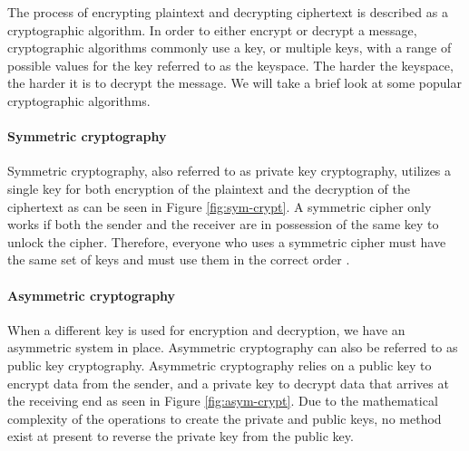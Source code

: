 The process of encrypting plaintext and decrypting ciphertext is described as a cryptographic algorithm. In order to either encrypt or decrypt a message, cryptographic algorithms commonly use a key, or multiple keys, with a range of possible values for the key referred to as the keyspace. The harder the keyspace, the harder it is to decrypt the message. We will take a brief look at some popular cryptographic algorithms.

\paragraph{Symmetric cryptography}
Symmetric cryptography, also referred to as private key cryptography, utilizes a single key for both encryption of the plaintext and the decryption of the ciphertext as can be seen in Figure \ref{fig:sym-crypt}. A symmetric cipher only works if both the sender and the receiver are in possession of the same key to unlock the cipher. Therefore, everyone who uses a symmetric cipher must have the same set of keys and must use them in the correct order \cite{dooley2018history}.


\paragraph{Asymmetric cryptography}
When a different key is used for encryption and decryption, we have an asymmetric system in place. Asymmetric cryptography can also be referred to as public key cryptography. Asymmetric cryptography relies on a public key to encrypt data from the sender, and a private key to decrypt data that arrives at the receiving end as seen in Figure \ref{fig:asym-crypt}. Due to the mathematical complexity of the operations to create the private and public keys, no method exist at present to reverse the private key from the public key.

